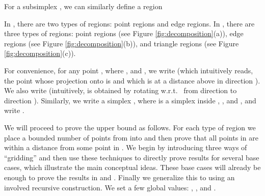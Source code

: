 \documentclass[11pt]{myclass}
\begin{document}
For a subsimplex , we can similarly define a region 

In , there are two types of regions: point regions and edge regions.  
In , there are three types of regions: point regions (see Figure \ref{fig:decomposition}(a)), edge regions (see Figure \ref{fig:decomposition}(b)), and triangle regions (see Figure \ref{fig:decomposition}(c)).  

For convenience, for any point , where , and , we write  (which intuitively reads, the point whose projection onto  is  and which is at a distance  above  in direction ). 
We also write  (intuitively,  is obtained by rotating  w.r.t.~ from direction  to direction ).
Similarly, we write a simplex , where  is a simplex inside , , and , and write . 


We will proceed to prove the upper bound as follows.  For each type of region  we place a bounded number of points from  into  and then prove that all points in  are within a distance  from some point in .  
We begin by introducing three ways of ``gridding''  and then use these techniques to directly prove results for several base cases, which illustrate the main conceptual ideas.  These base cases will already be enough to prove the results in  and .  Finally we generalize this to  using an involved recursive construction.  
We set a few global values: , , and .  
\end{document}
